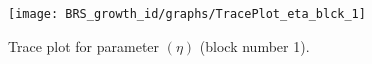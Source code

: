 \begin{figure}[H]
\centering
  \texttt{[image: BRS\_growth\_id/graphs/TracePlot\_eta\_blck\_1]}\\
    \caption{Trace plot for parameter $(\eta)$ (block number 1).}
\end{figure}
